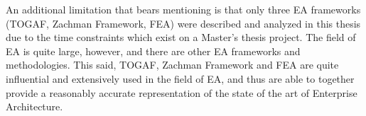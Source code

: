 An additional limitation that bears mentioning is that only three EA frameworks (TOGAF, Zachman Framework, FEA) were described and analyzed in this thesis due to the time constraints which exist on a Master's thesis project. The field of EA is quite large, however, and there are other EA frameworks and methodologies. This said, TOGAF, Zachman Framework and FEA are quite influential and extensively used in the field of EA, and thus are able to together provide a reasonably accurate representation of the state of the art of Enterprise Architecture. 


  